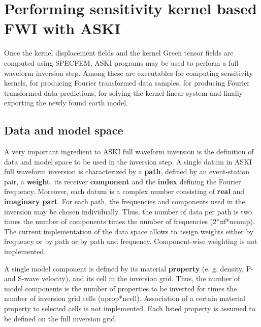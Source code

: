 %
\section{Performing sensitivity kernel based FWI with ASKI}
\label{sec:senskernels}
%
Once the kernel displacement fields and the kernel Green tensor fields are computed using SPECFEM, ASKI programs may be used to perform a full waveform inversion step. Among these are executables for computing sensitivity kernels, for producing Fourier transformed data samples, for producing Fourier transformed data predictions, for solving the kernel linear system and finally exporting the newly found earth model.
%
\subsection{Data and model space}
%
A very important ingredient to ASKI full waveform inversion is the definition of data and model space to be used in the inversion step. A single datum in ASKI full waveform inversion is characterized by a \textbf{path}, defined by an event-station pair, a \textbf{weight}, its receiver \textbf{component} and the \textbf{index} defining the Fourier frequency. Moreover, each datum is a complex number consisting of \textbf{real} and \textbf{imaginary part}. For each path, the frequencies and components used in the inversion may be chosen individually. Thus, the number of data per path is two times the number of components times the number of frequencies (2*nf*ncomp). The current implementation of the data space allows to assign weights either by frequency or by path or by path and frequency. Component-wise weighting is not implemented.

A single model component is defined by its material \textbf{property} (e. g. density, P- and S-wave velocity), and its cell in the inversion grid. Thus, the number of model components is the number of properties to be inverted for times the number of inversion grid cells (nprop*ncell). Association of a certain material property to selected cells is not implemented. Each listed property is assumed to be defined on the full inversion grid.

